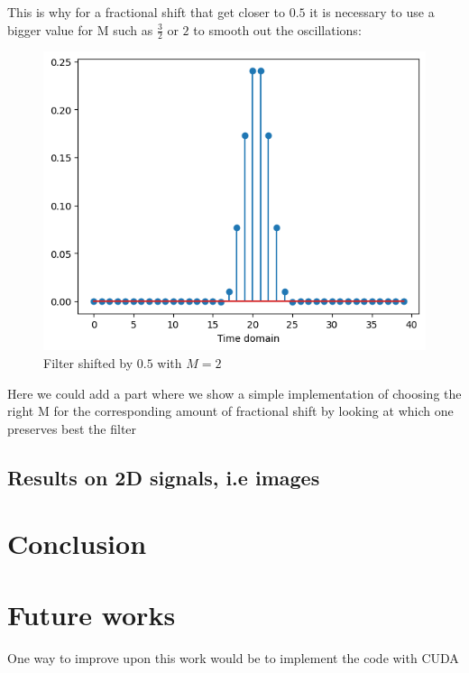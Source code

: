 \documentclass[]{usiinfbachelorproject}
\begin{document}
		This is why for a fractional shift that get closer to $0.5$ it is necessary to use a bigger value for M such as $\frac{3}{2}$ or $2$ to smooth out the oscillations:
		\begin{figure}[h]
			\centering
			\includegraphics[width=0.4\columnwidth]{images/Results/M_2_filter_big_shift.png}
			\caption{Filter shifted by $0.5$ with $M=2$}
			\label{big_shift_M_2_filter}
		\end{figure}
		
		
		Here we could add a part where we show a simple implementation of choosing the right M for the corresponding amount of fractional shift by looking at which one preserves best the filter
		
		
		\subsection{Results on 2D signals, i.e images}
		
		
		\section{Conclusion}
		
		\section{Future works}
		One way to improve upon this work would be to implement the code with CUDA
	
	
	
	
	
	
\end{document}
